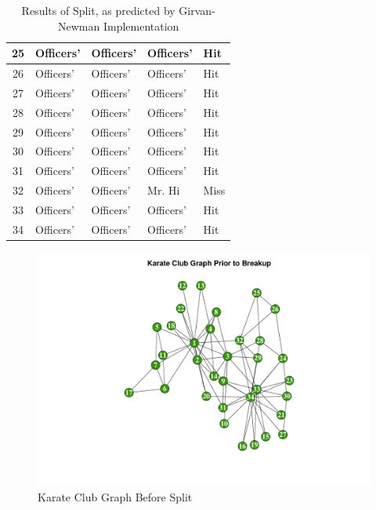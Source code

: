 \documentclass[letterpaper,11pt]{article}
\begin{document}
\begin{table}
\begin{tabular}{ | c | p{2cm} | p{2cm} | p{2cm} | p{2cm} | }
\hline
25 & Officers' & Officers' & Officers' & Hit \\
\hline
26 & Officers' & Officers' & Officers' & Hit \\
\hline
27 & Officers' & Officers' & Officers' & Hit \\
\hline
28 & Officers' & Officers' & Officers' & Hit \\
\hline
29 & Officers' & Officers' & Officers' & Hit \\
\hline
30 & Officers' & Officers' & Officers' & Hit \\
\hline
31 & Officers' & Officers' & Officers' & Hit \\
\hline
32 & Officers' & Officers' & Mr. Hi & Miss \\
\hline
33 & Officers' & Officers' & Officers' & Hit \\
\hline
34 & Officers' & Officers' & Officers' & Hit \\
\hline
\end{tabular}
\caption{Results of Split, as predicted by Girvan-Newman Implementation}
\label{tab:results}
\end{table}

\clearpage
\begin{figure}[h]
\includegraphics[scale=0.5]{club-before.pdf}
\caption{Karate Club Graph Before Split}
\label{fig:club-before}
\end{figure}
\end{document}
